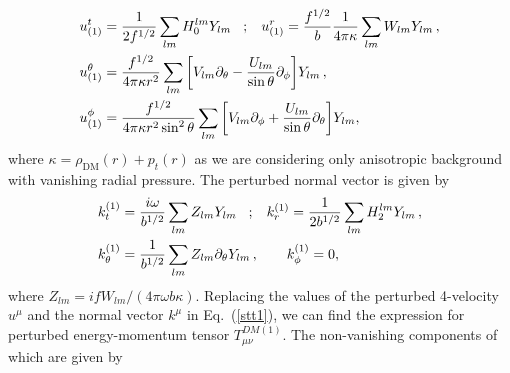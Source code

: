 \documentclass[11pt]{article}
\begin{document}
\begin{equation}\label{fluid_4_vel}
\begin{aligned}
u^{t}_{(1)} &= \frac{1}{2f^{1/2}}\sum_{lm} H^{l m}_0 Y_{l m} \hspace{3mm} ; \hspace{3mm}
u^{r}_{(1)} = \frac{f^{1/2}}{b}\frac{1}{4\pi\kappa}\sum_{lm} W_{l m}Y_{l m}\,, \\
u^{\theta}_{(1)}&=\frac{f^{1/2}}{4\pi\kappa r^2}\sum_{lm}\bigg[V_{l m}\partial_\theta -\frac{U_{l m}}{\sin\theta}\partial_\phi\bigg]Y_{l m}\,, \\
u^{\phi}_{(1)}&=\frac{f^{1/2}}{4\pi\kappa r^2\sin^2\theta}\sum_{lm}\bigg[V_{l m}\partial_\phi +\frac{U_{l m}}{\sin\theta}\partial_\theta\bigg]Y_{l m} ,
\end{aligned}
\end{equation}
where $\kappa = \rho_{\textrm{DM}}(r)+p_{t}(r)$ as we are considering only anisotropic background with vanishing radial pressure. The perturbed normal vector is given by 
\begin{equation}\label{fluid_normal_vec}
\begin{aligned}
k_{t}^{(1)} &= \frac{i\omega}{b^{1/2}}\sum_{lm} Z_{l m} Y_{l m} \hspace{3mm} ; \hspace{3mm}
k_{r}^{(1)} = \frac{1}{2b^{1/2}}\sum_{lm} H_2^{l m}Y_{l m}\,, \\
k_{\theta}^{(1)}&=\frac{1}{b^{1/2}}\sum_{lm} Z_{l m} \partial_{\theta}Y_{l m} \,,\qquad
k_{\phi}^{(1)}=0 ,
\end{aligned}
\end{equation}
where $Z_{lm}=i f W_{lm}/(4 \pi  \omega  b \kappa) $. Replacing the values of the perturbed 4-velocity $u^{\mu}$ and the normal vector $k^{\mu}$ in Eq.~(\ref{stt1}), we can find the expression for perturbed energy-momentum tensor $T_{\mu\nu}^{DM (1)}$. The non-vanishing components of which are given by 
\end{document}
